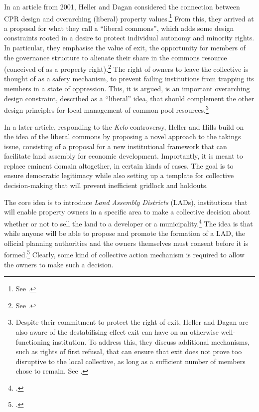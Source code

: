 In an article from 2001, Heller and Dagan considered the connection between CPR design and overarching (liberal) property values.\footnote{See \cite{heller01}.} From this, they arrived at a proposal for what they call a ``liberal commons'', which adds some design constraints rooted in a desire to protect individual autonomy and minority rights. In particular, they emphasise the value of exit, the opportunity for members of the governance structure to alienate their share in the commons resource (conceived of as a property right).\footnote{See \cite[567-572]{heller01}.} The right of owners to leave the collective is thought of as a safety mechanism, to prevent failing institutions from trapping its members in a state of oppression. This, it is argued, is an important overarching design constraint, described as a ``liberal'' idea, that should complement the other design principles for local management of common pool resources.\footnote{Despite their commitment to protect the right of exit, Heller and Dagan are also aware of the destabilising effect exit can have on an otherwise well-functioning institution. To address this, they discuss additional mechanisms, such as rights of first refusal, that can ensure that exit does not prove too disruptive to the local collective, as long as a sufficient number of members chose to remain. See \cite[596-702]{heller01}.}

In a later article, responding to the {\it Kelo} controversy, Heller and Hills build on the idea of the liberal commons by proposing a novel approach to the takings issue, consisting of a proposal for a new institutional framework that can facilitate land assembly for economic development. Importantly, it is meant to replace eminent domain altogether, in certain kinds of cases. The goal is to ensure democratic legitimacy while also setting up a template for collective decision-making that will prevent inefficient gridlock and holdouts. 

The core idea is to introduce {\it Land Assembly Districts} (LADs), institutions that will enable property owners in a specific area to make a collective decision about whether or not to sell the land to a developer or a municipality.\footcite[1469-1470]{heller08} The idea is that while anyone will be able to propose and promote the formation of a LAD, the official planning authorities and the owners themselves must consent before it is formed.\footcite[1488-1489]{heller08} Clearly, some kind of collective action mechanism is required to allow the owners to make such a decision. 

